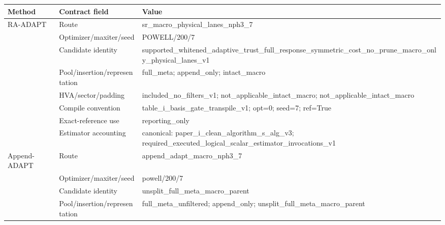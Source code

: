 \documentclass[10pt,letterpaper]{article}
\begin{document}
\begin{longtable}{@{}>{\raggedright\arraybackslash}p{0.9in}>{\raggedright\arraybackslash}p{1.65in}>{\raggedright\arraybackslash}p{4.7in}@{}}
\toprule
Method & Contract field & Value \\
\midrule
RA-ADAPT & Route & sr\_\allowbreak{}macro\_\allowbreak{}physical\_\allowbreak{}lanes\_\allowbreak{}nph3\_\allowbreak{}7 \\
 & Optimizer/maxiter/seed & POWELL/\allowbreak{}200/\allowbreak{}7 \\
 & Candidate identity & supported\_\allowbreak{}whitened\_\allowbreak{}adaptive\_\allowbreak{}trust\_\allowbreak{}full\_\allowbreak{}response\_\allowbreak{}symmetric\_\allowbreak{}cost\_\allowbreak{}no\_\allowbreak{}prune\_\allowbreak{}macro\_\allowbreak{}only\_\allowbreak{}physical\_\allowbreak{}lanes\_\allowbreak{}v1 \\
 & Pool/insertion/representation & full\_\allowbreak{}meta;\allowbreak{} append\_\allowbreak{}only;\allowbreak{} intact\_\allowbreak{}macro \\
 & HVA/sector/padding & included\_\allowbreak{}no\_\allowbreak{}filters\_\allowbreak{}v1;\allowbreak{} not\_\allowbreak{}applicable\_\allowbreak{}intact\_\allowbreak{}macro;\allowbreak{} not\_\allowbreak{}applicable\_\allowbreak{}intact\_\allowbreak{}macro \\
 & Compile convention & table\_\allowbreak{}i\_\allowbreak{}basis\_\allowbreak{}gate\_\allowbreak{}transpile\_\allowbreak{}v1;\allowbreak{} opt=0;\allowbreak{} seed=7;\allowbreak{} ref=True \\
 & Exact-reference use & reporting\_\allowbreak{}only \\
 & Estimator accounting & canonical:\allowbreak{} paper\_\allowbreak{}i\_\allowbreak{}clean\_\allowbreak{}algorithm\_\allowbreak{}s\_\allowbreak{}alg\_\allowbreak{}v3;\allowbreak{} required\_\allowbreak{}executed\_\allowbreak{}logical\_\allowbreak{}scalar\_\allowbreak{}estimator\_\allowbreak{}invocations\_\allowbreak{}v1 \\
\addlinespace[2pt]
Append-ADAPT & Route & append\_\allowbreak{}adapt\_\allowbreak{}macro\_\allowbreak{}nph3\_\allowbreak{}7 \\
 & Optimizer/maxiter/seed & powell/\allowbreak{}200/\allowbreak{}7 \\
 & Candidate identity & unsplit\_\allowbreak{}full\_\allowbreak{}meta\_\allowbreak{}macro\_\allowbreak{}parent \\
 & Pool/insertion/representation & full\_\allowbreak{}meta\_\allowbreak{}unfiltered;\allowbreak{} append\_\allowbreak{}only;\allowbreak{} unsplit\_\allowbreak{}full\_\allowbreak{}meta\_\allowbreak{}macro\_\allowbreak{}parent \\

\end{longtable}
\end{document}
